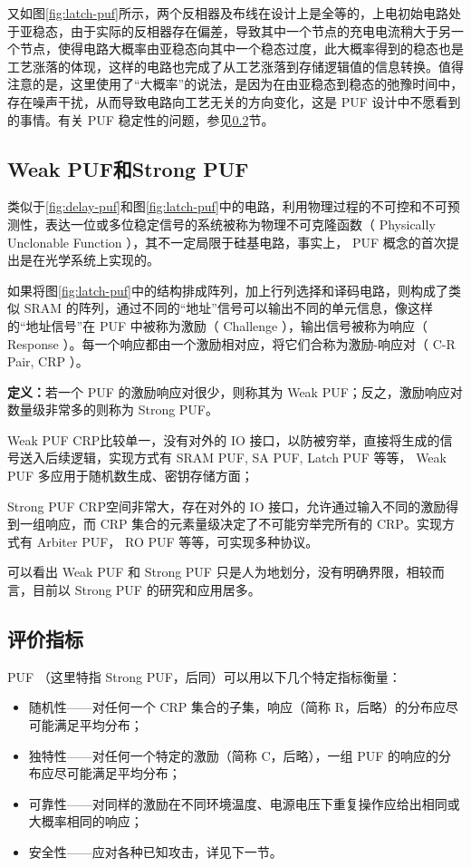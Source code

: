 又如图\ref{fig:latch-puf}所示，两个反相器及布线在设计上是全等的，上电初始电路处于亚稳态，由于实际的反相器存在偏差，导致其中一个节点的充电电流稍大于另一个节点，使得电路大概率由亚稳态向其中一个稳态过度，此大概率得到的稳态也是工艺涨落的体现，这样的电路也完成了从工艺涨落到存储逻辑值的信息转换。值得注意的是，这里使用了``大概率''的说法，是因为在由亚稳态到稳态的弛豫时间中，存在噪声干扰，从而导致电路向工艺无关的方向变化，这是 PUF 设计中不愿看到的事情。有关 PUF 稳定性的问题，参见\ref{subsec:metrics}节。

\subsection{Weak PUF和Strong PUF}\label{subsec:weakpuf}
类似于\ref{fig:delay-puf}和图\ref{fig:latch-puf}中的电路，利用物理过程的不可控和不可预测性，表达一位或多位稳定信号的系统被称为物理不可克隆函数（ Physically Unclonable Function ），其不一定局限于硅基电路，事实上， PUF 概念的首次提出是在光学系统上实现的\supercite{pappu2002physical}。

如果将图\ref{fig:latch-puf}中的结构排成阵列，加上行列选择和译码电路，则构成了类似 SRAM 的阵列，通过不同的``地址''信号可以输出不同的单元信息，像这样的``地址信号''在 PUF 中被称为激励（ Challenge ），输出信号被称为响应（ Response ）。每一个响应都由一个激励相对应，将它们合称为激励-响应对（ C-R Pair, CRP ）。

\textbf{定义：}若一个 PUF 的激励响应对很少，则称其为 Weak PUF；反之，激励响应对数量级非常多的则称为 Strong PUF\supercite{ruhrmair2014pufs}。

Weak PUF CRP比较单一，没有对外的 IO 接口，以防被穷举，直接将生成的信号送入后续逻辑，实现方式有 SRAM PUF, SA PUF, Latch PUF 等等\supercite{schrijen2012comparative,koeberl2012practical,xiao2014bit,maes2014countering,bhargava2013high}， Weak PUF 多应用于随机数生成、密钥存储方面；

Strong PUF CRP空间非常大，存在对外的 IO 接口，允许通过输入不同的激励得到一组响应，而 CRP 集合的元素量级决定了不可能穷举完所有的 CRP。实现方式有 Arbiter PUF， RO PUF 等等，可实现多种协议。

可以看出 Weak PUF 和 Strong PUF 只是人为地划分，没有明确界限，相较而言，目前以 Strong PUF 的研究和应用居多\supercite{rostami2014quo}。

\subsection{评价指标}\label{subsec:metrics}
PUF （这里特指 Strong PUF，后同）可以用以下几个特定指标衡量：
\begin{itemize}
\item 随机性——对任何一个 CRP 集合的子集，响应（简称 R，后略）的分布应尽可能满足平均分布；
\item 独特性——对任何一个特定的激励（简称 C，后略），一组 PUF 的响应的分布应尽可能满足平均分布；
\item 可靠性——对同样的激励在不同环境温度、电源电压下重复操作应给出相同或大概率相同的响应；
\item 安全性——应对各种已知攻击，详见下一节。
\end{itemize}


